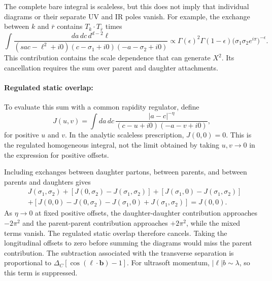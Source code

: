 \documentclass[%
 onecolumn,
 superscriptaddress,
 preprintnumbers,
 nofootinbib,
 amsmath,amssymb,
 aps,
 prl,
]{revtex4-2}
\newcommand{\bb}{\boldsymbol b}
\newcommand{\DD}{\Delta_C}
\begin{document}
The complete bare integral is scaleless,
but this does not imply that individual
diagrams or their separate UV
and IR poles vanish. For example,
the exchange between $k$ and $\bar r$
contains $T_k\cdot T_{\bar r}$ times
\begin{equation}
\int\frac{da\,dc\,d^{d-2}\boldsymbol\ell}{(sac-\boldsymbol\ell^2+i0)(c-\sigma_1+i0)(-a-\sigma_2+i0)}
\propto\Gamma(\epsilon)^2\Gamma(1-\epsilon)
\big(\sigma_1\sigma_2e^{i\pi}\big)^{-\epsilon}.
\end{equation}
This contribution contains the scale dependence
that can generate $X^2$. Its cancellation
requires the sum over parent and daughter
attachments.

\paragraph{Regulated static overlap: }
To evaluate this sum with a common rapidity
regulator, define
\begin{equation}
J(u,v)=\int da\,dc\,
\frac{|a-c|^{-\eta}}
{(c-u+i0)(-a-v+i0)},
\label{eq:jointoverlap}
\end{equation}
for positive $u$ and $v$.
In the analytic scaleless prescription,
$J(0,0)=0$. This is the regulated
homogeneous integral, not the limit
obtained by taking $u,v\to0$ in the
expression for positive offsets.

Including exchanges between daughter partons,
between parents, and between parents and
daughters gives
\begin{equation}
\begin{split}
&J(\sigma_1,\sigma_2)
+[J(0,\sigma_2)-J(\sigma_1,\sigma_2)]+[J(\sigma_1,0)-J(\sigma_1,\sigma_2)]
\\&+[J(0,0)-J(0,\sigma_2)-J(\sigma_1,0)
+J(\sigma_1,\sigma_2)]
=J(0,0).
\end{split}
\label{eq:fullstaticcancel}
\end{equation}
As $\eta\to0$ at fixed positive offsets,
the daughter-daughter contribution approaches
$-2\pi^2$ and the parent-parent contribution
approaches $+2\pi^2$, while the mixed terms
vanish. The regulated static overlap therefore
cancels. Taking the longitudinal offsets to
zero before summing the diagrams would miss
the parent contribution.
%
The subtraction associated with the transverse
separation is proportional to
$\DD[\cos(\boldsymbol\ell\cdot\bb)-1]$.
For ultrasoft momentum,
$|\boldsymbol\ell|b\sim\lambda$,
so this term is suppressed.
\end{document}
